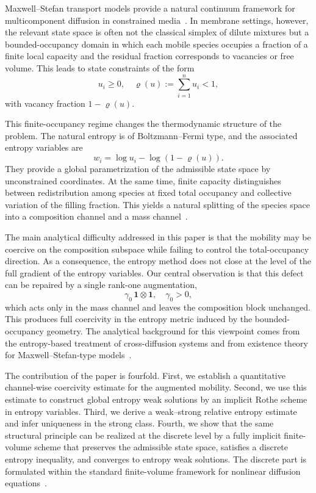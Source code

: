 \documentclass{article}
\newcommand{\bone}{\mathbf{1}}
\begin{document}
Maxwell--Stefan transport models provide a natural continuum framework
for multicomponent diffusion in constrained media~\cite{Maxwell1866,
Krishna1997,Giovangigli1999,Bothe2011}. In membrane settings, however,
the relevant state space is often not the classical simplex of dilute
mixtures but a bounded-occupancy domain in which each mobile species
occupies a fraction of a finite local capacity and the residual fraction
corresponds to vacancies or free volume. This leads to state constraints
of the form
\[
  u_i \ge 0,\quad \varrho(u) := \sum_{i=1}^n u_i < 1,
\]
with vacancy fraction $1-\varrho(u)$.

This finite-occupancy regime changes the thermodynamic structure of the
problem. The natural entropy is of Boltzmann--Fermi type, and the
associated entropy variables are
\[
  w_i = \log u_i - \log(1-\varrho(u)).
\]
They provide a global parametrization of the admissible state space by
unconstrained coordinates. At the same time, finite capacity distinguishes
between redistribution among species at fixed total occupancy and
collective variation of the filling fraction. This yields a natural
splitting of the species space into a composition channel and a mass
channel~\cite{Bothe2011,BoetheDreyer2015,Jungel2015}.

The main analytical difficulty addressed in this paper is that the
mobility may be coercive on the composition subspace while failing to
control the total-occupancy direction. As a consequence, the entropy
method does not close at the level of the full gradient of the entropy
variables. Our central observation is that this defect can be repaired
by a single rank-one augmentation,
\[
  \gamma_0\,\bone\otimes\bone,\quad \gamma_0 > 0,
\]
which acts only in the mass channel and leaves the composition block
unchanged. This produces full coercivity in the entropy metric induced
by the bounded-occupancy geometry. The analytical background for this
viewpoint comes from the entropy-based treatment of cross-diffusion
systems and from existence theory for Maxwell--Stefan-type
models~\cite{JungelStelzer2013,Jungel2015,Jungel2017}.

The contribution of the paper is fourfold. First, we establish a
quantitative channel-wise coercivity estimate for the augmented mobility.
Second, we use this estimate to construct global entropy weak solutions
by an implicit Rothe scheme in entropy variables. Third, we derive a
weak--strong relative entropy estimate and infer uniqueness in the strong
class. Fourth, we show that the same structural principle can be realized
at the discrete level by a fully implicit finite-volume scheme that
preserves the admissible state space, satisfies a discrete entropy
inequality, and converges to entropy weak solutions. The discrete part is
formulated within the standard finite-volume framework for nonlinear
diffusion equations~\cite{Eymard2000,EymardGallouetHerbich2002,
BessemoulinFilbet2012}.
\end{document}
